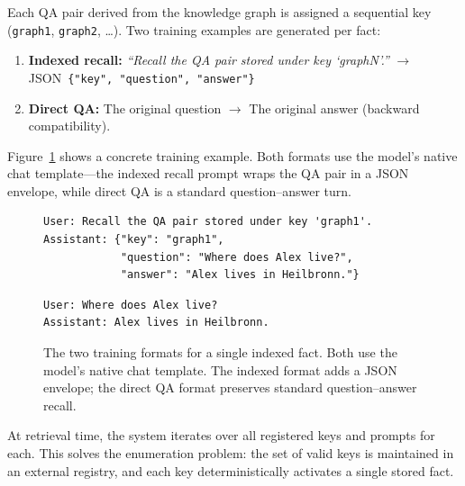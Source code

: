 \documentclass[11pt]{article}
\begin{document}
Each QA pair derived from the knowledge graph is assigned a sequential key (\texttt{graph1}, \texttt{graph2}, \ldots).
Two training examples are generated per fact:

\begin{enumerate}
    \item \textbf{Indexed recall:} \textit{``Recall the QA pair stored under key `graph\textit{N}'.''} $\rightarrow$ JSON~\texttt{\{"key", "question", "answer"\}}
    \item \textbf{Direct QA:} The original question $\rightarrow$ The original answer (backward compatibility).
\end{enumerate}

\noindent Figure~\ref{fig:format} shows a concrete training example.
Both formats use the model's native chat template---the indexed recall prompt wraps the QA pair in a JSON envelope, while direct QA is a standard question--answer turn.

\begin{figure}[b]
\centering
\begin{lstlisting}[title={\small Indexed recall training example (chat template applied)}]
User: Recall the QA pair stored under key 'graph1'.
Assistant: {"key": "graph1",
            "question": "Where does Alex live?",
            "answer": "Alex lives in Heilbronn."}
\end{lstlisting}
\vspace{-0.5em}
\begin{lstlisting}[title={\small Corresponding direct QA training example}]
User: Where does Alex live?
Assistant: Alex lives in Heilbronn.
\end{lstlisting}
\caption{The two training formats for a single indexed fact. Both use the model's native chat template. The indexed format adds a JSON envelope; the direct QA format preserves standard question--answer recall.}
\label{fig:format}
\end{figure}

At retrieval time, the system iterates over all registered keys and prompts for each.
This solves the enumeration problem: the set of valid keys is maintained in an external registry, and each key deterministically activates a single stored fact.

\end{document}
